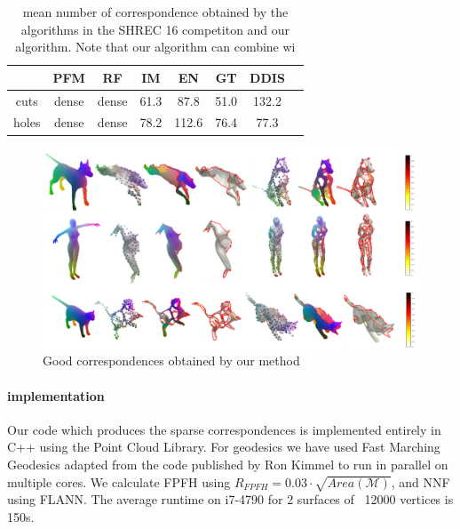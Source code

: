 \documentclass[10pt,twocolumn,letterpaper]{article}
\begin{document}
\begin{table}[h]
	\centering
	\begin{tabular}{c  c  c  c  c  c  c c} 
		\hline
		& PFM & RF & IM & EN & GT & DDIS  \\ \hline
		cuts & dense & dense & 61.3 & 87.8 & 51.0 & 132.2\\ \hline
		holes & dense & dense & 78.2 & 112.6 & 76.4 & 77.3 \\ \hline
		
	\end{tabular}
	\caption{mean number of correspondence obtained by the algorithms in the SHREC 16 competiton and our algorithm. Note that our algorithm can combine wi}
	\label{table:1}
\end{table}

\begin{figure}[htb]
	\centering

	\includegraphics[width=1\textwidth]{figures/success_1}
	\caption{Good correspondences obtained by our method}
\end{figure}



\paragraph{implementation}
Our code which produces the sparse correspondences is implemented entirely in C++ using the Point Cloud Library. For geodesics we have used  Fast Marching Geodesics adapted from the code published by Ron Kimmel to run in parallel on multiple cores. We calculate FPFH using $R_{FPFH}=0.03\cdot \sqrt{Area(\mathcal{M})}$, and NNF using FLANN. The average runtime on i7-4790 for 2 surfaces of ~12000 vertices is 150s.

{\small
	
	
}
\end{document}
